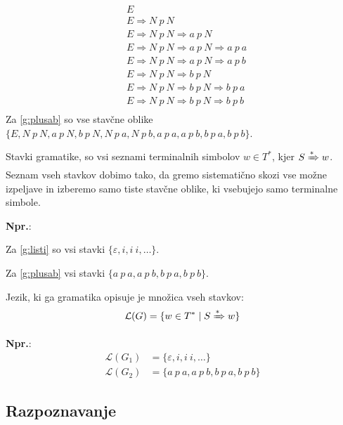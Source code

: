 \documentclass{article}
\newcommand{\Ex}{\textbf{Npr.}:\ }
\newcommand{\Grammar}{G}
\newcommand{\Terminals}{T}
\newcommand{\StartSymbol}{S}
\newcommand{\Null}{\varepsilon}
\newcommand{\Language}[1]{\mathcal{L}(#1)}
\newcommand{\Derive}{\Rightarrow}
\newcommand{\DeriveStar}{\xRightarrow{\ast}}
\newcommand{\Seq}{\ }
\newcommand{\Kleene}[1]{#1^\ast}
\begin{document}
  \begin{align*}
    &E \\
    &E \Derive N \Seq p \Seq N \\
    &E \Derive N \Seq p \Seq N \Derive a \Seq p \Seq N\\
    &E \Derive N \Seq p \Seq N \Derive a \Seq p \Seq N \Derive a \Seq p \Seq a\\
    &E \Derive N \Seq p \Seq N \Derive a \Seq p \Seq N \Derive a \Seq p \Seq b\\
    &E \Derive N \Seq p \Seq N \Derive b \Seq p \Seq N\\
    &E \Derive N \Seq p \Seq N \Derive b \Seq p \Seq N \Derive b \Seq p \Seq a\\
    &E \Derive N \Seq p \Seq N \Derive b \Seq p \Seq N \Derive b \Seq p \Seq b\\
  \end{align*}
Za \ref{g:plusab} so vse stavčne oblike $\{E, N \Seq p \Seq N, a \Seq p \Seq N, b \Seq p \Seq N, N \Seq p \Seq a, N \Seq p \Seq b, a \Seq p \Seq a, a \Seq p \Seq b, b \Seq p \Seq a, b \Seq p \Seq b \}$.

Stavki gramatike, so vsi seznami terminalnih simbolov $w \in \Kleene{\Terminals}$, kjer $\StartSymbol \DeriveStar w$.
Seznam vseh stavkov dobimo tako, da gremo sistematično skozi vse možne izpeljave in izberemo samo tiste stavčne oblike, ki vsebujejo samo terminalne simbole.

\Ex

Za \ref{g:listi} so vsi stavki $\{\Null, i, i \Seq i, \dots\}$.

Za \ref{g:plusab} vsi stavki $\{a \Seq p \Seq a, a \Seq p \Seq b, b \Seq p \Seq a, b \Seq p \Seq b \}$.

Jezik, ki ga gramatika opisuje je množica vseh stavkov:
\begin{equation*}
  \Language{\Grammar} = \{ w \in \Kleene{T} \mid \StartSymbol \DeriveStar w\}
\end{equation*}

\Ex
  \begin{align*}
    \Language{\Grammar_1} &= \{\Null, i, i \Seq i, \dots\}\\
    \Language{\Grammar_2} &= \{a \Seq p \Seq a, a \Seq p \Seq b, b \Seq p \Seq a, b \Seq p \Seq b \}
  \end{align*}

\subsection{Razpoznavanje}
\end{document}
